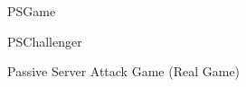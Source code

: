 \begin{figure}[!h]
  \centering
  \begin{center}
    \begin{bbrenv}{PSGame}
      \begin{bbrbox}[name=Adversary, minheight=2cm]
        
      \end{bbrbox}
      \begin{bbrchallenger}{PSChallenger}
        \begin{bbrbox}[name=Challenger, minheight=2cm]
       \end{bbrbox}
      \end{bbrchallenger}
    \end{bbrenv}
  \end{center}
  \caption{Passive Server Attack Game (Real Game)}
  \label{fig:passiveServerGame}
\end{figure}

